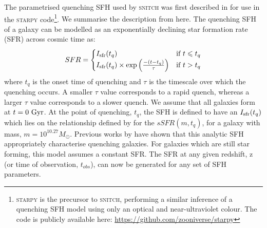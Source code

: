 \documentclass[useAMS,usenatbib]{mn2e}
\def\referee		{\color{refer}}
\begin{document}
The parametrised quenching SFH used by \textsc{snitch} was first described in \cite{smethurst15} for use in the \textsc{starpy} code\footnote{\textsc{starpy} is the precursor to \textsc{snitch}, performing a similar inference of a quenching SFH model using only an optical and near-ultraviolet colour. The code is publicly available here: \url{https://github.com/zooniverse/starpy}}. {\referee We summarise the description from \cite{smethurst15} here. The quenching SFH of a galaxy can be modelled as an exponentially declining star formation rate (SFR) across cosmic time as:
\begin{equation}\label{sfh}
SFR =
\begin{cases}
I_{\rm{sfr}}(t_q) & \text{if } t \leq t_q \\
I_{\rm{sfr}}(t_q) \times \exp{\left( \frac{-(t-t_{q})}{\tau}\right)} & \text{if } t > t_q 
\end{cases}
\end{equation}
where $t_{q}$ is the onset time of quenching and $\tau$ is the timescale over which the quenching occurs.  A smaller $\tau$ value corresponds to a rapid quench, whereas a larger $\tau$ value corresponds to a slower quench. We assume that all galaxies form at $t=0~\rm{Gyr}$. At the point of quenching, $t_{q}$, the SFH is defined to have an $I_{\rm{sfr}}(t_q)$ which lies on the relationship defined by \citet[][Equation 1]{peng10} for the $sSFR(m,t_q)$, for a galaxy with mass, $m = 10^{10.27} M_{\odot}$. Previous works by \citep{weiner06, martin07, noeske07,schawinski14, smethurst15} have shown that this analytic SFH appropriately characterise quenching galaxies. For galaxies which are still star forming, this model assumes a constant SFR. The SFR at any given redshift, z (or time of observation, $t_{obs}$), can now be generated for any set of SFH parameters.}



\end{document}
